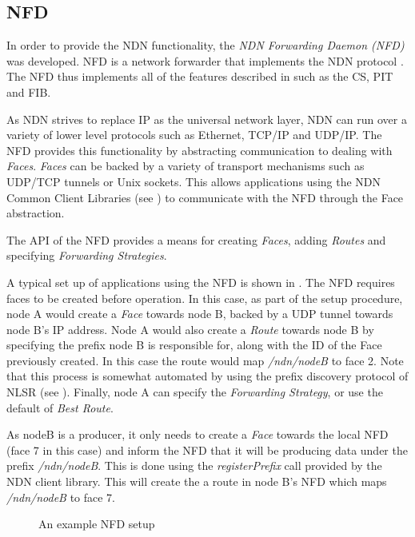 \subsection{NFD}
In order to provide the NDN functionality, the \textit{NDN Forwarding Daemon (NFD)} was developed. NFD is a network forwarder that implements the NDN protocol \cite{nfd-github}. The NFD thus implements all of the features described in  such as the CS, PIT and FIB. 

 As NDN strives to replace IP as the universal network layer, NDN can run over a variety of lower level protocols such as Ethernet, TCP/IP and UDP/IP. The NFD provides this functionality by abstracting communication to dealing with \textit{Faces}. \textit{Faces} can be backed by a variety of transport mechanisms such as UDP/TCP tunnels or Unix sockets. This allows applications using the NDN Common Client Libraries (see ) to communicate with the NFD through the Face abstraction.

 The API of the NFD provides a means for creating \textit{Faces}, adding \textit{Routes} and specifying \textit{Forwarding Strategies}.
 
 A typical set up of applications using the NFD is shown in . The NFD requires faces to be created before operation. In this case, as part of the setup procedure, node A would create a \textit{Face} towards node B, backed by a UDP tunnel towards node B's IP address. Node A would also create a \textit{Route} towards node B by specifying the prefix node B is responsible for, along with the ID of the Face previously created. In this case the route would map \textit{/ndn/nodeB} to face 2. Note that this process is somewhat automated by using the prefix discovery protocol of NLSR (see ). Finally, node A can specify the \textit{Forwarding Strategy}, or use the default of \textit{Best Route}.


As nodeB is a producer, it only needs to create a \textit{Face} towards the local NFD (face 7 in this case) and inform the NFD that it will be producing data under the prefix \textit{/ndn/nodeB}. This is done using the  \textit{registerPrefix} call provided by the NDN client library. This will create the a route in node B's NFD which maps \textit{/ndn/nodeB} to face 7.
\begin{figure}[H]
    \centering
    \caption{An example NFD setup}
    \label{fig:nfd-setup}
\end{figure}

